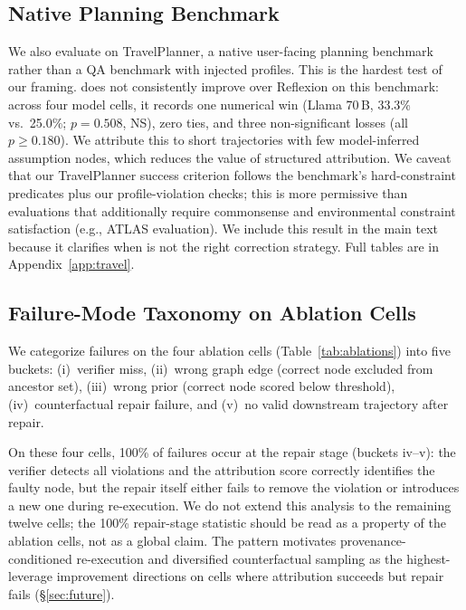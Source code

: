 \subsection{Native Planning Benchmark}
\label{sec:res-travel}

We also evaluate on TravelPlanner, a native user-facing planning
benchmark rather than a QA benchmark with injected profiles.  This is
the hardest test of our framing.  \method does not consistently improve
over Reflexion on this benchmark: across four model cells, it records
one numerical win (Llama 70\,B, 33.3\% vs.\ 25.0\%; $p{=}0.508$, NS),
zero ties, and three non-significant losses (all $p \geq 0.180$).
We attribute this to short trajectories with few model-inferred
assumption nodes, which reduces the value of structured attribution.
We caveat that our TravelPlanner success criterion follows the
benchmark's hard-constraint predicates plus our profile-violation
checks; this is more permissive than evaluations that additionally
require commonsense and environmental constraint satisfaction (e.g.,
ATLAS evaluation).  We include this result in the main text because
it clarifies when \method is not the right correction strategy.  Full
tables are in Appendix~\ref{app:travel}.


\subsection{Failure-Mode Taxonomy on Ablation Cells}
\label{sec:failure-taxonomy}

We categorize \method failures on the four ablation cells
(Table~\ref{tab:ablations}) into five buckets: (i)~verifier miss,
(ii)~wrong graph edge (correct node excluded from ancestor set),
(iii)~wrong prior (correct node scored below threshold),
(iv)~counterfactual repair failure, and (v)~no valid downstream
trajectory after repair.

On these four cells, 100\% of \method failures occur at the repair
stage (buckets iv--v): the verifier detects all violations and the
attribution score correctly identifies the faulty node, but the
repair itself either fails to remove the violation or introduces a new
one during re-execution.  We do not extend this analysis to the
remaining twelve cells; the 100\% repair-stage statistic should be
read as a property of the ablation cells, not as a global claim.
The pattern motivates provenance-conditioned re-execution and
diversified counterfactual sampling as the highest-leverage improvement
directions on cells where attribution succeeds but repair fails
(\S\ref{sec:future}).


